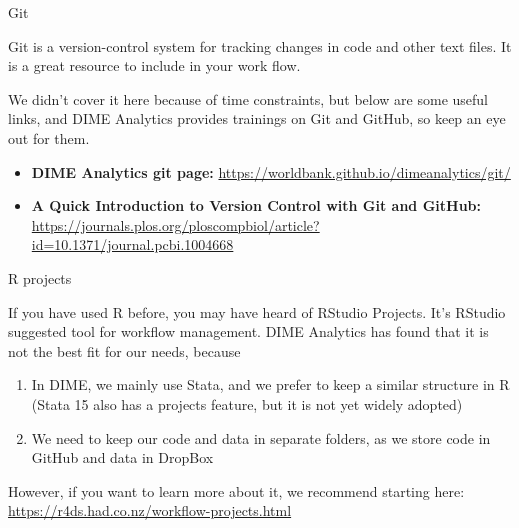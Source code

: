 \documentclass[ignorenonframetext,]{beamer}
\providecommand{\tightlist}{%
  \setlength{\itemsep}{0pt}\setlength{\parskip}{0pt}}
\begin{document}
\begin{frame}{Git}

Git is a version-control system for tracking changes in code and other
text files. It is a great resource to include in your work flow.

We didn't cover it here because of time constraints, but below are some
useful links, and DIME Analytics provides trainings on Git and GitHub,
so keep an eye out for them.

\begin{itemize}
\tightlist
\item
  \textbf{DIME Analytics git page:}
  \url{https://worldbank.github.io/dimeanalytics/git/}
\item
  \textbf{A Quick Introduction to Version Control with Git and GitHub:}
  \url{https://journals.plos.org/ploscompbiol/article?id=10.1371/journal.pcbi.1004668}
\end{itemize}

\end{frame}

\begin{frame}{R projects}

If you have used R before, you may have heard of RStudio Projects. It's
RStudio suggested tool for workflow management. DIME Analytics has found
that it is not the best fit for our needs, because

\begin{enumerate}
\def\labelenumi{\arabic{enumi}.}
\item
  In DIME, we mainly use Stata, and we prefer to keep a similar
  structure in R (Stata 15 also has a projects feature, but it is not
  yet widely adopted)
\item
  We need to keep our code and data in separate folders, as we store
  code in GitHub and data in DropBox
\end{enumerate}

However, if you want to learn more about it, we recommend starting here:
\url{https://r4ds.had.co.nz/workflow-projects.html}

\end{frame}
\end{document}
